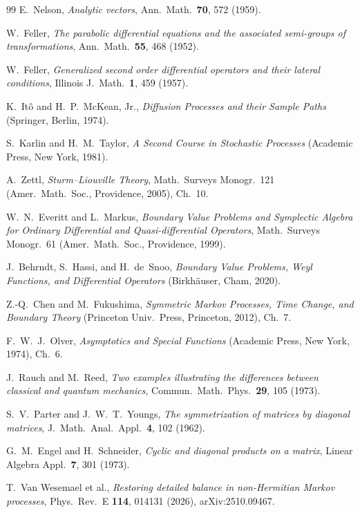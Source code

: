 \documentclass[11pt]{article}
\theoremstyle{definition}
\theoremstyle{remark}
\begin{document}
\begin{thebibliography}{99}
E.~Nelson,
\emph{Analytic vectors},
Ann.\ Math.\ \textbf{70}, 572 (1959).

W.~Feller,
\emph{The parabolic differential equations and the associated semi-groups
of transformations},
Ann.\ Math.\ \textbf{55}, 468 (1952).

W.~Feller,
\emph{Generalized second order differential operators and their lateral
conditions},
Illinois J.\ Math.\ \textbf{1}, 459 (1957).

K.~It\^o and H.~P.~McKean, Jr.,
\emph{Diffusion Processes and their Sample Paths}
(Springer, Berlin, 1974).

S.~Karlin and H.~M.~Taylor,
\emph{A Second Course in Stochastic Processes}
(Academic Press, New York, 1981).

A.~Zettl,
\emph{Sturm--Liouville Theory},
Math.\ Surveys Monogr.~121 (Amer.\ Math.\ Soc., Providence, 2005),
Ch.~10.

W.~N.~Everitt and L.~Markus,
\emph{Boundary Value Problems and Symplectic Algebra for Ordinary
Differential and Quasi-differential Operators},
Math.\ Surveys Monogr.~61 (Amer.\ Math.\ Soc., Providence, 1999).

J.~Behrndt, S.~Hassi, and H.~de~Snoo,
\emph{Boundary Value Problems, Weyl Functions, and Differential
Operators} (Birkh\"auser, Cham, 2020).

Z.-Q.~Chen and M.~Fukushima,
\emph{Symmetric Markov Processes, Time Change, and Boundary Theory}
(Princeton Univ.\ Press, Princeton, 2012), Ch.~7.

F.~W.~J.~Olver,
\emph{Asymptotics and Special Functions}
(Academic Press, New York, 1974), Ch.~6.

J.~Rauch and M.~Reed,
\emph{Two examples illustrating the differences between classical and
quantum mechanics},
Commun.\ Math.\ Phys.\ \textbf{29}, 105 (1973).

S.~V.~Parter and J.~W.~T.~Youngs,
\emph{The symmetrization of matrices by diagonal matrices},
J.\ Math.\ Anal.\ Appl.\ \textbf{4}, 102 (1962).

G.~M.~Engel and H.~Schneider,
\emph{Cyclic and diagonal products on a matrix},
Linear Algebra Appl.\ \textbf{7}, 301 (1973).

T.~Van Wesemael et al.,
\emph{Restoring detailed balance in non-Hermitian Markov processes},
Phys.\ Rev.\ E \textbf{114}, 014131 (2026), arXiv:2510.09467.


\end{thebibliography}
\end{document}
